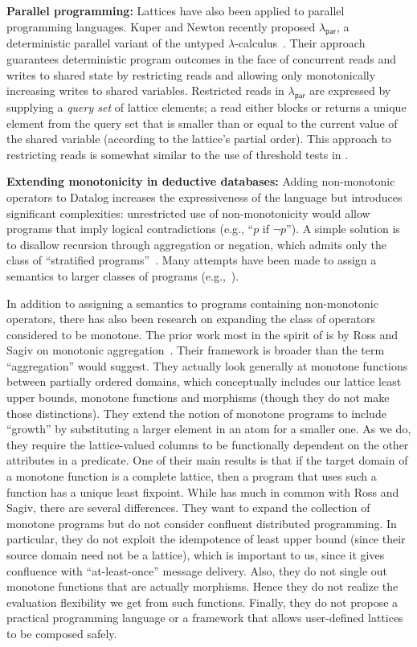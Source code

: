\vspace{0.5em}\noindent
\textbf{Parallel programming:} Lattices have also been applied to parallel
programming languages. Kuper and Newton recently proposed
$\lambda_{\textsf{par}}$, a deterministic parallel variant of the untyped
$\lambda$-calculus~\cite{Kuper2012}. Their approach guarantees deterministic
program outcomes in the face of concurrent reads and writes to shared state by
restricting reads and allowing only monotonically increasing writes to shared
variables.  Restricted reads in $\lambda_{\textsf{par}}$ are expressed by
supplying a \emph{query set} of lattice elements; a read either blocks or
returns a unique element from the query set that is smaller than or equal to the
current value of the shared variable (according to the lattice's partial
order). This approach to restricting reads is somewhat similar to the use of
threshold tests in \lang.

\vspace{0.5em}\noindent
\textbf{Extending monotonicity in deductive databases:} Adding non-monotonic
operators to Datalog increases the expressiveness of the language but introduces
significant complexities: unrestricted use of non-monotonicity would allow
programs that imply logical contradictions (e.g., ``$p$ if $\lnot p$''). A
simple solution is to disallow recursion through aggregation or negation, which
admits only the class of ``stratified programs''~\cite{Apt1988}. Many attempts
have been made to assign a semantics to larger classes of programs
(e.g.,~\cite{Gelfond1988,Ross1990,VanGelder1991}).

In addition to assigning a semantics to programs containing non-monotonic
operators, there has also been research on expanding the class of operators
considered to be monotone. The prior work most in the spirit of \lang is by Ross
and Sagiv on monotonic aggregation~\cite{Ross1992}. Their framework is broader
than the term ``aggregation'' would suggest. They actually look generally at
monotone functions between partially ordered domains, which conceptually
includes our lattice least upper bounds, monotone functions and morphisms
(though they do not make those distinctions). They extend the notion of monotone
programs to include ``growth'' by substituting a larger element in an atom for a
smaller one. As we do, they require the lattice-valued columns to be
functionally dependent on the other attributes in a predicate. One of their main
results is that if the target domain of a monotone function is a complete
lattice, then a program that uses such a function has a unique least
fixpoint. While \lang has much in common with Ross and Sagiv, there are several
differences. They want to expand the collection of monotone programs but do not
consider confluent distributed programming. In particular, they do not exploit
the idempotence of least upper bound (since their source domain need not be a
lattice), which is important to us, since it gives confluence with
``at-least-once'' message delivery. Also, they do not single out monotone
functions that are actually morphisms. Hence they do not realize the evaluation
flexibility we get from such functions. Finally, they do not propose a practical
programming language or a framework that allows user-defined lattices to be
composed safely.

